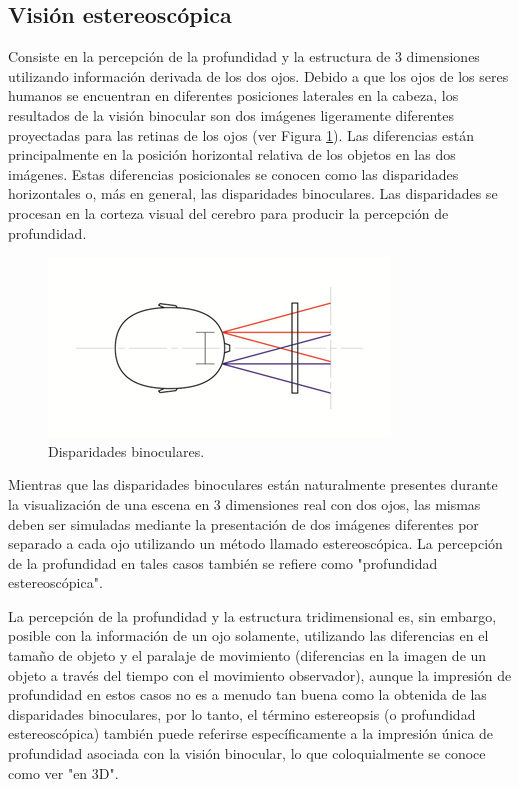 \documentclass[12pt]{article}
\begin{document}
\subsection{Visión estereoscópica}
Consiste en la percepción de la profundidad y la estructura de 3 dimensiones utilizando información derivada de los dos ojos. Debido a que los ojos de los seres humanos se encuentran en diferentes posiciones laterales en la cabeza, los resultados de la visión binocular son dos imágenes ligeramente diferentes proyectadas para las retinas de los ojos (ver Figura \ref{disparidades}). Las diferencias están principalmente en la posición horizontal relativa de los objetos en las dos imágenes. Estas diferencias posicionales se conocen como las disparidades horizontales o, más en general, las disparidades binoculares. Las disparidades se procesan en la corteza visual del cerebro para producir la percepción de profundidad\cite{visionest}. 
\begin{figure}[h!]
\includegraphics[width =0.7\linewidth, center]{ojos.png}
\caption{Disparidades binoculares.}
\label{disparidades}
\end{figure}

Mientras que las disparidades binoculares están naturalmente presentes durante la visualización de una escena en 3 dimensiones real con dos ojos, las mismas deben ser simuladas mediante la presentación de dos imágenes diferentes por separado a cada ojo utilizando un método llamado estereoscópica. La percepción de la profundidad en tales casos también se refiere como "profundidad estereoscópica". 

La percepción de la profundidad y la estructura tridimensional  es, sin embargo, posible con la información de un ojo solamente, utilizando las diferencias en el tamaño de objeto y el paralaje de movimiento (diferencias en la imagen de un objeto a través del tiempo con el movimiento observador), aunque la impresión de profundidad en estos casos no es a menudo tan buena como la obtenida de las disparidades binoculares, por lo tanto, el término estereopsis (o profundidad estereoscópica) también puede referirse específicamente a la impresión única de profundidad asociada con la visión binocular, lo que coloquialmente se conoce como ver "en 3D".
\end{document}

